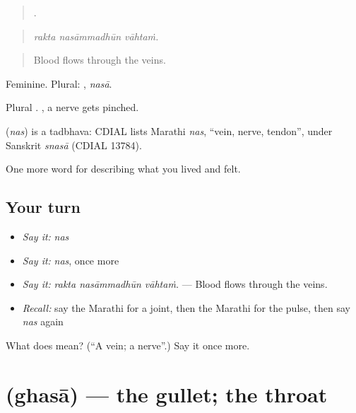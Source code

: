 \begin{quote}
  .
\end{quote}

\begin{quote}
\emph{rakta nasāmmadhūn vāhtaṁ.}
\end{quote}

\begin{quote}
Blood flows through the veins.
\end{quote}

Feminine. Plural: , \emph{nasā}.

Plural .  , a nerve gets pinched.

\begin{cousinweb}
\textbf{} (\emph{nas}) is a tadbhava: CDIAL lists Marathi \emph{nas}, \textquotedblleft{}vein, nerve, tendon\textquotedblright{}, under Sanskrit \emph{snasā} (CDIAL 13784).
\end{cousinweb}

\begin{grammarlens}[title={What you've built}]
One more word for describing what you lived and felt.
\end{grammarlens}

\subsection*{Your turn}
\begin{itemize}
\raggedright
  \item \emph{Say it:} \emph{nas}
  \item \emph{Say it:} \emph{nas}, once more
  \item \emph{Say it:} \emph{rakta nasāmmadhūn vāhtaṁ.} — Blood flows through the veins.
  \item \emph{Recall:} say the Marathi for a joint, then the Marathi for the pulse, then say \emph{nas} again
\end{itemize}

\begin{tcolorbox}[breakable,colback=teal!4,colframe=teal!35!black,title={Before you move on}]
What does  mean? (\textquotedblleft{}A vein; a nerve\textquotedblright{}.) Say it once more.
\end{tcolorbox}
\section[\texorpdfstring{\mr{घसा} (ghasā)}{घसा (ghasā)}]{ (ghasā) — the gullet; the throat}


